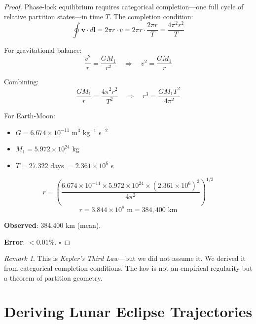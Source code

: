 \documentclass[12pt,a4paper]{article}
\theoremstyle{definition}
\theoremstyle{remark}
\newtheorem{remark}[theorem]{Remark}
\begin{document}
\begin{proof}
Phase-lock equilibrium requires categorical completion---one full cycle of relative partition states---in time $T$. The completion condition:
\begin{equation}
\oint \mathbf{v} \cdot d\mathbf{l} = 2\pi r \cdot v = 2\pi r \cdot \frac{2\pi r}{T} = \frac{4\pi^2 r^2}{T}
\end{equation}

For gravitational balance:
\begin{equation}
\frac{v^2}{r} = \frac{GM_1}{r^2} \quad \Rightarrow \quad v^2 = \frac{GM_1}{r}
\end{equation}

Combining:
\begin{equation}
\frac{GM_1}{r} = \frac{4\pi^2 r^2}{T^2} \quad \Rightarrow \quad r^3 = \frac{GM_1 T^2}{4\pi^2}
\end{equation}

For Earth-Moon:
\begin{itemize}
    \item $G = 6.674 \times 10^{-11}$ m$^3$ kg$^{-1}$ s$^{-2}$
    \item $M_1 = 5.972 \times 10^{24}$ kg
    \item $T = 27.322$ days $= 2.361 \times 10^6$ s
\end{itemize}

\begin{equation}
r = \left(\frac{6.674 \times 10^{-11} \times 5.972 \times 10^{24} \times (2.361 \times 10^6)^2}{4\pi^2}\right)^{1/3}
\end{equation}
\begin{equation}
r = 3.844 \times 10^8 \text{ m} = 384{,}400 \text{ km}
\end{equation}

\textbf{Observed}: 384,400 km (mean).

\textbf{Error}: $< 0.01\%$. $\square$
\end{proof}

\begin{remark}
This is \emph{Kepler's Third Law}---but we did not assume it. We derived it from categorical completion conditions. The law is not an empirical regularity but a theorem of partition geometry.
\end{remark}

\section{Deriving Lunar Eclipse Trajectories}
\label{sec:eclipses}
\end{document}
